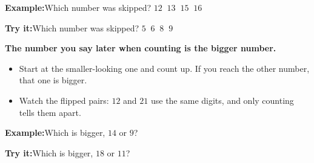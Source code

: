 \documentclass[14pt]{extarticle}
\begin{document}
\begin{examplebox}
\textbf{Example:}\quad Which number was skipped? $12\;\;13\;\;15\;\;16$
\end{examplebox}

\begin{tryitbox}
\textbf{Try it:}\quad Which number was skipped? $5\;\;6\;\;8\;\;9$\\[2pt]
\end{tryitbox}


\begin{formulabox}
\textbf{The number you say later when counting is the bigger number.}
\begin{itemize}[leftmargin=0.8cm, itemsep=0pt, topsep=1pt]
  \item Start at the smaller-looking one and count up. If you reach the other number, that one is bigger.
  \item Watch the flipped pairs: $12$ and $21$ use the same digits, and only counting tells them apart.
\end{itemize}
\end{formulabox}

\begin{examplebox}
\textbf{Example:}\quad Which is bigger, $14$ or $9$?
\end{examplebox}

\begin{tryitbox}
\textbf{Try it:}\quad Which is bigger, $18$ or $11$?\\[2pt]
\end{tryitbox}
\end{document}
